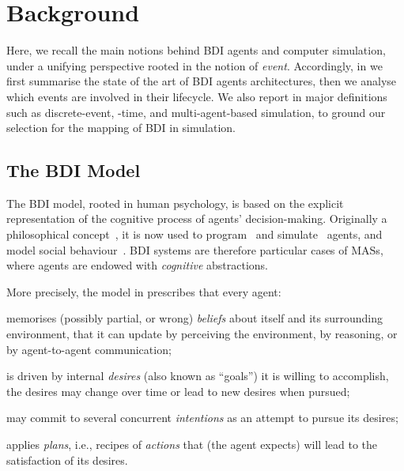 \section{Background}
\label{sec:simulation:background}

Here,
we recall the main notions behind \ac{BDI} agents and computer simulation,
under a unifying perspective rooted in the notion of \emph{event}.
%
Accordingly,
in  we first summarise the state of the art of \ac{BDI} agents architectures,
then we analyse which events are involved in their lifecycle.
%
We also report in 
major definitions such as discrete-event, -time, and multi-agent-based simulation,
to ground our selection for the mapping of \ac{BDI} in simulation.

\subsection{The \acl{BDI} Model}
\label{subsec:BDI-agents}

The \ac{BDI} model,
rooted in human psychology,
is based on the explicit representation of the cognitive process of
agents'
decision-making.
%
Originally a philosophical concept~\cite{bratman1987intention},
it is now used to program~\cite{BordiniHW2007}
and simulate~\cite{HubnerB09} agents,
and model social behaviour~\cite{AdamGaudou2016}.
%
\ac{BDI} systems are therefore particular cases of \acp{MAS},
where agents are endowed with \emph{cognitive} abstractions.

More precisely,
the model in \cite{RaoG95} prescribes that every agent: %
%
\begin{inlinelist}
    \item memorises (possibly partial, or wrong) \emph{beliefs} about itself and its surrounding environment,
    that it can update by perceiving the environment, by reasoning, or by agent-to-agent communication;
    \item is driven by internal \emph{desires} (also known as ``goals'') it is willing to accomplish,
    the desires may change over time
    or lead to new desires when pursued;
    \item may commit to several concurrent \emph{intentions} as an attempt to pursue its desires;
    \item applies \textit{plans}, i.e., recipes of \textit{actions} that (the agent expects)
    will lead to the satisfaction of its desires.
\end{inlinelist}

